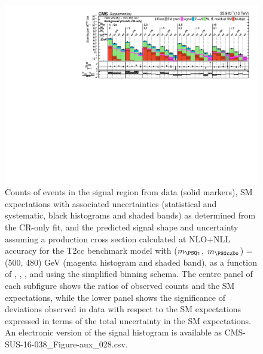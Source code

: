 \begin{figure}[p]
    \begin{center}
        \includegraphics[width=1.00\textwidth]{Supplementary/CMS-SUS-16-038_Figure-aux_028.pdf}
  \caption{Counts of events in the signal region from data (solid markers), SM expectations
    with associated uncertainties (statistical and systematic, black
    histograms and shaded bands) as determined from the CR-only fit,
    and the predicted signal shape and uncertainty assuming a production cross
    section calculated at NLO+NLL accuracy for the
        T2cc benchmark model with ($m_{\PSQt}$, $m_{\PSGczDo}$) = (500, 480) GeV
    (magenta histogram and shaded band),
    as a function of \njet, \nb, \scalht, and \mht using the simplified binning schema.
    The centre panel of each subfigure shows the ratios of
    observed counts and the SM expectations, while the lower panel
    shows the significance of deviations observed in data with respect
    to the SM expectations expressed in terms of the total uncertainty
    in the SM expectations.  
	An electronic version of the signal histogram is available as CMS-SUS-16-038\_Figure-aux\_028.csv.
        }
        \label{fig:T2cc_500_480_MR_sig}
    \end{center}
\end{figure}


